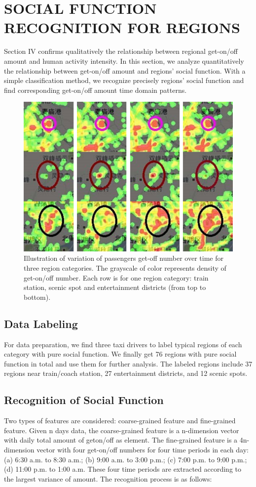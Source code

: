 \documentclass[a4paper, 10pt, conference]{ieeeconf}      %
\begin{document}
\section{SOCIAL FUNCTION RECOGNITION FOR REGIONS}%
Section IV confirms qualitatively the relationship between regional get-on/off amount and human activity intensity. In this section, we analyze quantitatively the relationship between get-on/off amount and regions’ social function. With a simple classification method, we recognize precisely regions’ social function and find corresponding get-on/off amount time domain patterns.
\begin{figure}[htpb]
    \centering
    \includegraphics{fig/f2.png}
    \caption{Illustration of variation of passengers get-off number over time for three region categories. The grayscale of color represents density of get-on/off number. Each row is for one region category: train station, scenic spot and entertainment districts (from top to bottom).}
    \label{fig:my_label_2}
\end{figure}
\subsection{Data Labeling} For data preparation, we find three taxi drivers to label typical regions of each category with pure social function. We finally get 76 regions with pure social function in total and use them for further analysis. The labeled regions include 37 regions near train/coach station, 27 entertainment districts, and 12 scenic spots.
\subsection{Recognition of Social Function}Two types of features are considered: coarse-grained feature and fine-grained feature. Given n days data, the coarse-grained feature is a n-dimension vector with daily total amount of geton/off as element. The fine-grained feature is a 4n-dimension vector with four get-on/off numbers for four time periods in each day: (a) 6:30 a.m. to 8:30 a.m.; (b) 9:00 a.m. to 3:00 p.m.; (c) 7:00 p.m. to 9:00 p.m.; (d) 11:00 p.m. to 1:00 a.m. These four time periods are extracted according to the largest variance of amount. The recognition process is as follows:
\end{document}
